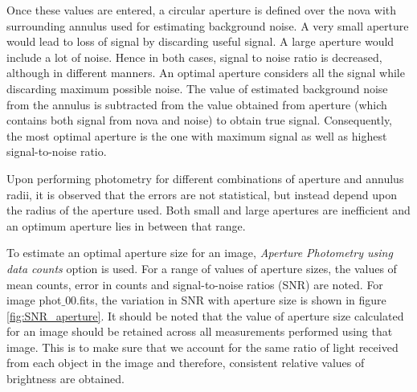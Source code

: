 \documentclass{tda}
\begin{document}
	Once these values are entered, a circular aperture is defined over the nova with surrounding annulus used for estimating background noise. A very small aperture would lead to loss of signal by discarding useful signal. A large aperture would include a lot of noise. Hence in both cases, signal to noise ratio is decreased, although in different manners. An optimal aperture considers all the signal while discarding maximum possible noise. The value of estimated background noise from the annulus is subtracted from the value obtained from aperture (which contains both signal from nova and noise) to obtain true signal. Consequently, the most optimal aperture is the one with maximum signal as well as highest signal-to-noise ratio.

	Upon performing photometry for different combinations of aperture and annulus radii, it is observed that the errors are not statistical, but instead depend upon the radius of the aperture used. Both small and large apertures are inefficient and an optimum aperture lies in between that range.

	To estimate an optimal aperture size for an image, \emph{Aperture Photometry using data counts} option is used. For a range of values of aperture sizes, the values of mean counts, error in counts and signal-to-noise ratios (SNR) are noted. For image phot\(\_\)00.fits, the variation in SNR with aperture size is shown in figure \ref{fig:SNR_aperture}. It should be noted that the value of aperture size calculated for an image should be retained across all measurements performed using that image. This is to make sure that we account for the same ratio of light received from each object in the image and therefore, consistent relative values of brightness are obtained. 
\end{document}
